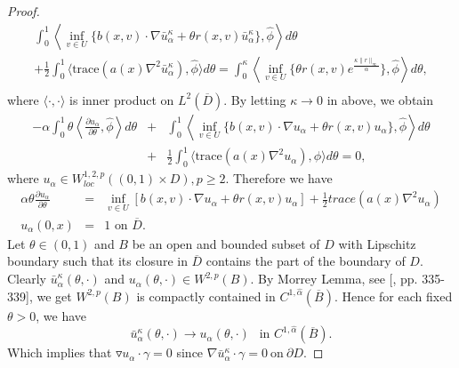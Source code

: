 \documentclass[11pt]{amsart}
\numberwithin{equation}{section}
\begin{document}
\begin{proof}
\begin{eqnarray}
 \int_0^1 \left\langle \inf_{ v\in U} \{b(x,v) \cdot \nabla \bar u^{\kappa}_{\alpha}+ 
 \theta r(x,v)\bar u^{\kappa}_{\alpha} \}, \hat \phi \right\rangle d\theta  \nonumber \\
  + \frac{1}{2} \int_0^1 \langle \mbox{trace}(a(x) \nabla^2 \bar u^{\kappa}_{\alpha}), \hat \phi \rangle d\theta  = 
\int_0^{\kappa} \left\langle \inf_{v\in U} \{ \theta r(x,v) e^{\frac{\kappa \|r\|_{\infty}}{\alpha}} \}, \hat \phi
\right\rangle d\theta, \nonumber \\
\end{eqnarray}
where $\langle \cdot, \cdot\rangle$ is inner product on $L^2(\overline{D})$. 
By letting $\kappa \longrightarrow 0$ in above, we obtain
\begin{eqnarray*}
-\alpha \int_0^1 \theta \left\langle \frac{ \partial  u_{\alpha} }{\partial \theta}, \hat \phi\right\rangle d\theta  &+&
 \int_0^1 \left\langle \inf_{ v\in U} \{b(x,v) \cdot \nabla  u_{\alpha}+ 
 \theta r(x,v) u_{\alpha} \}, \hat \phi \right\rangle d\theta \\
 & + & \frac{1}{2} \int_0^1 \langle \mbox{trace}(a(x) \nabla^2  u_{\alpha}), \hat \phi \rangle d\theta  = 
0,
\end{eqnarray*}
where $ u_{\alpha} \in W^{1,2,p}_{loc}((0,1)\times  D ), p\geq 2$. Therefore we have
\begin{equation*}
\begin{array}{rcl}
\displaystyle{
 \alpha\theta\frac{\partial u_{\alpha}}{\partial \theta} } &=& \displaystyle{ \inf_{v \in U} 
\left[ b(x,v)\cdot 
\nabla u_{\alpha} + \theta r(x,v)u_{\alpha}\right] 
+ \frac{1}{2}trace (a(x)\nabla^2 u_{\alpha})  } \\
\displaystyle{ u_{\alpha}(0,x) } &=& \displaystyle{ 1 \mbox{ on } \overline {D}. }
\end{array}
\end{equation*}
Let $\theta \in (0,1)$ and $B$ be an open and bounded subset of $D$ with Lipschitz boundary such that its closure in $\overline{D}$ contains the part of the boundary of $D$. Clearly $\bar u^{\kappa}_{\alpha}(\theta,\cdot)$ and $u_{\alpha}(\theta,\cdot) \in  W^{2,p}( B)$. By Morrey Lemma, see [\cite{leoni}, pp. 335-339], we get $ W^{2,p}(B)$ is compactly contained in $C^{1,\hat \alpha}(\overline B)$. Hence for each fixed $\theta>0$, we have
\begin{equation*}
\bar u^{\kappa}_{\alpha}(\theta,\cdot) \longrightarrow u_{\alpha}(\theta,\cdot) \ \ \mbox{ in } C^{1,\hat \alpha}(\overline B).
\end{equation*}
Which implies that $\triangledown u_{\alpha} \cdot \gamma=0$ since $\displaystyle{  \nabla \bar u^{\kappa}_{\alpha} \cdot \gamma=0 \ \mbox{on} \ \partial D.}$ 


\end{proof}
\end{document}
